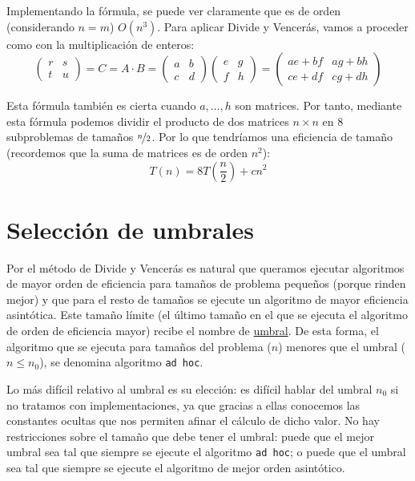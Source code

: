 Implementando la fórmula, se puede ver claramente que es de orden (considerando $n = m$) $O(n^3)$. Para aplicar Divide y Vencerás, vamos a proceder como con la multiplicación de enteros:
\begin{equation*}
    \begin{pmatrix}
        r & s \\
        t & u
        \end{pmatrix} = C = A \cdot B = \begin{pmatrix}
        a & b \\
        c & d
        \end{pmatrix} \begin{pmatrix}
        e & g \\
        f & h
        \end{pmatrix} = \begin{pmatrix}
        ae+bf & ag+bh \\
        ce + df & cg + dh
    \end{pmatrix}
\end{equation*}

Esta fórmula también es cierta cuando $a, \ldots, h$ son matrices. Por tanto, mediante esta fórmula podemos dividir el producto de dos matrices $n \times n$ en 8 subproblemas de tamaños $\nicefrac{n}{2}$. Por lo que tendríamos una eficiencia de tamaño (recordemos que la suma de matrices es de orden $n^2$):
\begin{equation*}
    T(n) = 8T\left(\dfrac{n}{2}\right) + cn^2
\end{equation*}


\section{Selección de umbrales}
Por el método de Divide y Vencerás es natural que queramos ejecutar algoritmos de mayor orden de eficiencia para tamaños de problema pequeños (porque rinden mejor) y que para el resto de tamaños se ejecute un algoritmo de mayor eficiencia asintótica. Este tamaño límite (el último tamaño en el que se ejecuta el algoritmo de orden de eficiencia mayor) recibe el nombre de \ul{umbral}. De esta forma, el algoritmo que se ejecuta para tamaños del problema ($n$) menores que el umbral ($n \leq n_0$), se denomina algoritmo \verb|ad hoc|.

Lo más difícil relativo al umbral es su elección: es difícil hablar del umbral $n_0$ si no tratamos con implementaciones, ya que gracias a ellas conocemos las constantes ocultas que nos permiten afinar el cálculo de dicho valor. No hay restricciones sobre el tamaño que debe tener el umbral: puede que el mejor umbral sea tal que siempre se ejecute el algoritmo \verb|ad hoc|; o puede que el umbral sea tal que siempre se ejecute el algoritmo de mejor orden asintótico. 


